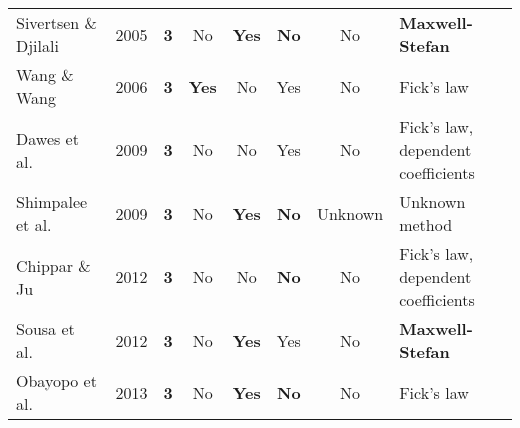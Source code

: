 \begin{landscape}
\begin{longtable}{lccccccl}
    Sivertsen \& Djilali~\cite{Sivertsen2005} & 2005 & \textbf{3} & No & \textbf{Yes} & \textbf{No} & No & \textbf{Maxwell-Stefan} \\
    Wang \& Wang~\cite{Wang2006} & 2006 & \textbf{3} & \textbf{Yes} & No & Yes & No & Fick's law \\
    Dawes et al.~\cite{Dawes2009} & 2009 & \textbf{3} & No & No & Yes & No & Fick's law, dependent coefficients \\
    Shimpalee et al.~\cite{Shimpalee2009} & 2009 & \textbf{3} & No & \textbf{Yes} & \textbf{No} & Unknown & Unknown method \\
    Chippar \& Ju~\cite{Chippar2012} & 2012 & \textbf{3} & No & No & \textbf{No} & No & Fick's law, dependent coefficients \\
    Sousa et al.~\cite{Sousa2012} & 2012 & \textbf{3} & No & \textbf{Yes} & Yes & No & \textbf{Maxwell-Stefan} \\
    Obayopo et al.~\cite{Obayopo2013} & 2013 & \textbf{3} & No & \textbf{Yes} & \textbf{No} & No & Fick's law \\
  \end{longtable}
\end{landscape}




